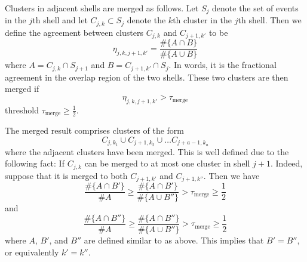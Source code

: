 \documentclass{article}
\begin{document}
Clusters in adjacent shells are merged as follows. Let $S_j$ denote the set of events in the $j$th shell and let $C_{j,k}\subset S_j$ denote the $k$th cluster in the $j$th shell. Then we define the agreement between clusters $C_{j,k}$ and $C_{j+1,k'}$ to be
$$\eta_{j,k,j+1,k'}=\frac{\#\{A\cap B\}}{\#\{A\cup B\}}$$ where
$A=C_{j,k}\cap S_{j+1}$ and $B=C_{j+1,k'}\cap S_j$. In words, it is the fractional agreement in the overlap region of the two shells. These two clusters are then merged if 
$$\eta_{j,k,j+1,k'}>\tau_{\text{merge}}$$  threshold $\tau_{\text{merge}}\geq \frac{1}{2}$.

The merged result comprises clusters of the form
$$C_{j,k_1}\cup C_{j+1,k_2}\cup\dots C_{j+a-1,k_a}$$
where the adjacent clusters have been merged. This is well defined due to the following fact: If $C_{j,k}$ can be merged to at most one cluster in shell $j+1$. Indeed, suppose that it is merged to both $C_{j+1,k'}$ and $C_{j+1,k''}$. Then we have
$$\frac{\#\{A\cap B'\}}{\#A}\geq\frac{\#\{A\cap B'\}}{\#\{A\cup B''\}}>\tau_{\text{merge}}\geq\frac{1}{2}$$
and
$$\frac{\#\{A\cap B''\}}{\#A}\geq\frac{\#\{A\cap B''\}}{\#\{A\cup B''\}}>\tau_{\text{merge}}\geq\frac{1}{2}$$
where $A$, $B'$, and $B''$ are defined similar to as above. This implies that $B'=B''$, or equivalently $k'=k''$.
\end{document}
